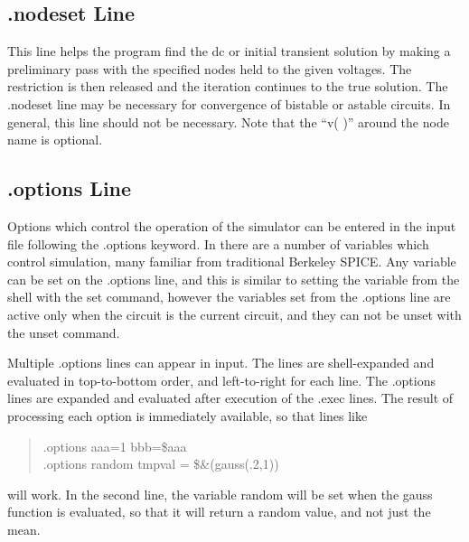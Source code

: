 \subsection{{\vt .nodeset} Line}

This line helps the program find the dc or initial transient solution
by making a preliminary pass with the specified nodes held to the
given voltages.  The restriction is then released and the iteration
continues to the true solution.  The {\vt .nodeset} line may be
necessary for convergence of bistable or astable circuits.  In
general, this line should not be necessary.  Note that the ``{\vt v(
)}'' around the node name is optional.

\subsection{{\vt .options} Line}

Options which control the operation of the simulator can be entered in
the {\WRspice} input file following the {\vt .options} keyword.  In
{\WRspice} there are a number of variables which control simulation,
many familiar from traditional Berkeley SPICE.  Any variable can be
set on the {\vt .options} line, and this is similar to setting the
variable from the shell with the {\cb set} command, however the
variables set from the {\vt .options} line are active only when the
circuit is the current circuit, and they can not be unset with the
{\cb unset} command.

Multiple {\vt .options} lines can appear in input.  The lines are
shell-expanded and evaluated in top-to-bottom order, and left-to-right
for each line.  The {\vt .options} lines are expanded and evaluated
after execution of the {\vt .exec} lines.  The result of processing
each option is immediately available, so that lines like
\begin{quote}\vt
  .options aaa=1 bbb=\$aaa\\
  .options random tmpval = \$\&(gauss(.2,1))
\end{quote}
will work.  In the second line, the variable {\et random} will be set
when the {\vt gauss} function is evaluated, so that it will return a
random value, and not just the mean.

